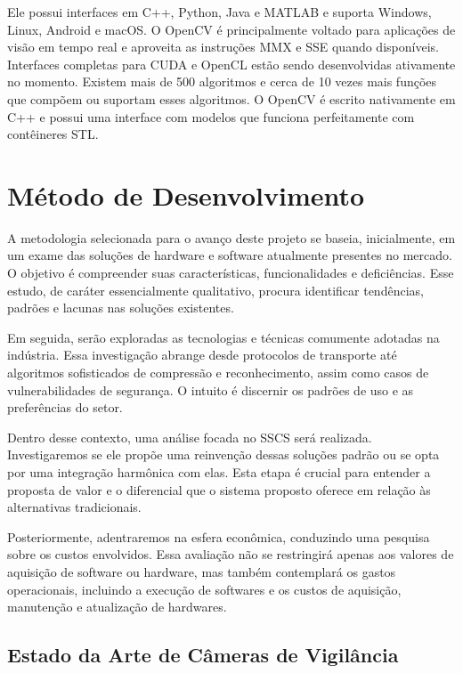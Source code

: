 \documentclass[12pt, %
openright, 
oneside, %
a4paper,    %
brazil]{facom-ufu-abntex2}
\begin{document}
Ele possui interfaces em C++, Python, Java e MATLAB e suporta Windows, Linux,
Android e macOS. O OpenCV é principalmente voltado para aplicações de visão em
tempo real e aproveita as instruções MMX e SSE quando disponíveis. Interfaces
completas para CUDA e OpenCL estão sendo desenvolvidas ativamente no momento.
Existem mais de 500 algoritmos e cerca de 10 vezes mais funções que compõem ou
suportam esses algoritmos. O OpenCV é escrito nativamente em C++ e possui uma
interface com modelos que funciona perfeitamente com contêineres STL.
\cite{opencvwebsite}

\chapter{Método de Desenvolvimento}

A metodologia selecionada para o avanço deste projeto se baseia, inicialmente,
em um exame das soluções de hardware e software atualmente presentes no
mercado. O objetivo é compreender suas características, funcionalidades e
deficiências. Esse estudo, de caráter essencialmente qualitativo, procura
identificar tendências, padrões e lacunas nas soluções existentes.

Em seguida, serão exploradas as tecnologias e técnicas comumente adotadas na
indústria. Essa investigação abrange desde protocolos de transporte até
algoritmos sofisticados de compressão e reconhecimento, assim como casos de
vulnerabilidades de segurança. O intuito é discernir os padrões de uso e as
preferências do setor.

Dentro desse contexto, uma análise focada no SSCS será realizada.
Investigaremos se ele propõe uma reinvenção dessas soluções padrão ou se opta
por uma integração harmônica com elas. Esta etapa é crucial para entender a
proposta de valor e o diferencial que o sistema proposto oferece em relação às
alternativas tradicionais.

Posteriormente, adentraremos na esfera econômica, conduzindo uma pesquisa sobre
os custos envolvidos. Essa avaliação não se restringirá apenas aos valores de
aquisição de software ou hardware, mas também contemplará os gastos
operacionais, incluindo a execução de softwares e os custos de aquisição,
manutenção e atualização de hardwares.

\section{Estado da Arte de Câmeras de Vigilância}
\end{document}
